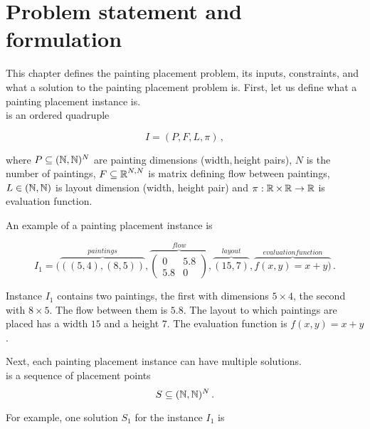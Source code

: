 \chapter{Problem statement and formulation}\label{ch:problem-statement-and-formulation}

This chapter defines the painting placement problem, its inputs, constraints, and what a solution to the painting placement problem is.
First, let us define what a painting placement instance is.\\

 is an ordered quadruple

\begin{equation}
    I = (P, F, L, \pi)\,,
    \label{eq:painting-placement-instance}
\end{equation}

where $P \subseteq (\operatorname*{\mathbb{N}}, \operatorname*{\mathbb{N}})^N$ are painting dimensions (width$, $height pairs),
$N$ is the number of paintings,
$F \subseteq \operatorname*{\mathbb{R}}^{N, N}$ is matrix defining flow between paintings,
$L \in (\operatorname*{\mathbb{N}}, \operatorname*{\mathbb{N}})$ is layout dimension (width, height pair)
and $\pi: \operatorname*{\mathbb{R}} \times \operatorname*{\mathbb{R}} \to \operatorname*{\mathbb{R}}$ is evaluation function.

An example of a painting placement instance is

\[
    I_1 = (\overbrace{((5,4),(8,5))}^{paintings},
    \overbrace{\begin{pmatrix}
                   0   & 5.8 \\
                   5.8 & 0
    \end{pmatrix}}^{flow},
    \overbrace{(15,7)}^{layout},
    \overbrace{f(x,y) = x+y)}^{evaluation function}\,.
\]

Instance $I_1$ contains two paintings, the first with dimensions $5\times4$, the second with $8\times5$.
The flow between them is $5.8$.
The layout to which paintings are placed has a width $15$ and a height $7$.
The evaluation function is $f(x,y) = x+y$.

Next, each painting placement instance can have multiple solutions.\\

 is a sequence of placement points
\begin{equation}
    S \subseteq (\operatorname*{\mathbb{N}},\operatorname*{\mathbb{N}})^N  \,.
    \label{eq:painting-placement-solution}
\end{equation}

For example, one solution $S_1$ for the instance $I_1$ is

